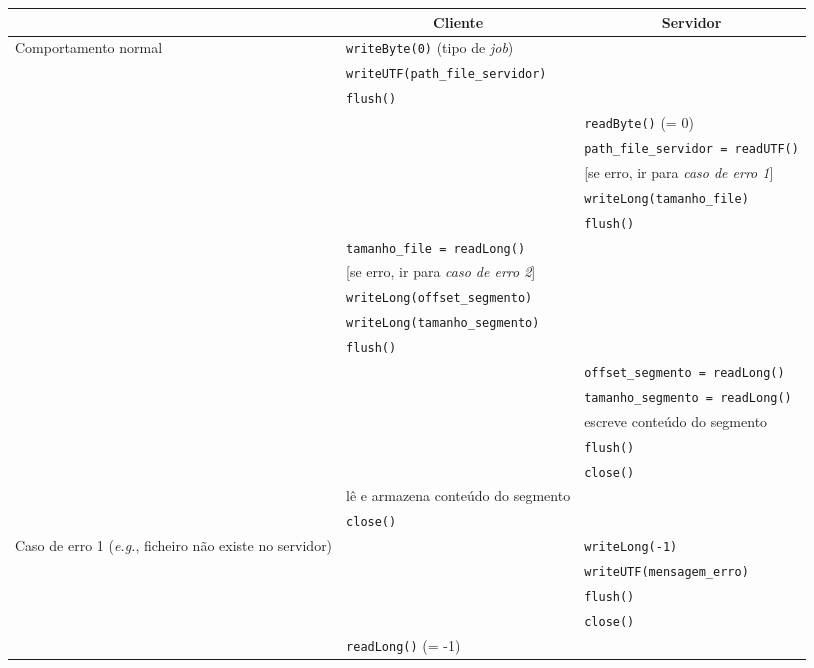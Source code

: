 \begin{table}[p]
    \centering
    \setlength{\tabcolsep}{6.5pt}
    \renewcommand{\arraystretch}{1.15}
    \begin{tabularx}{\textwidth}{|p{2cm}|X|X|}
        \cline{2-3}
        \multicolumn{1}{l|}{} & \multicolumn{1}{c|}{\textbf{Cliente}} & \multicolumn{1}{c|}{\textbf{Servidor}} \\
        \hline \multirow[t]{5}{=}{Comportamento normal}
         & \verb|writeByte(0)| (tipo de \emph{job}) & \\
         & \verb|writeUTF(path_file_servidor)| & \\
         & \verb|flush()| & \\
         & & \verb|readByte()| (= 0) \\
         & & \verb|path_file_servidor = readUTF()| \\
         & & [se erro, ir para \emph{caso de erro 1}] \\
         & & \verb|writeLong(tamanho_file)| \\
         & & \verb|flush()| \\
         & \verb|tamanho_file = readLong()| & \\
         & [se erro, ir para \emph{caso de erro 2}] & \\
         & \verb|writeLong(offset_segmento)| & \\
         & \verb|writeLong(tamanho_segmento)| & \\
         & \verb|flush()| & \\
         & & \verb|offset_segmento = readLong()| \\
         & & \verb|tamanho_segmento = readLong()| \\
         & & escreve conteúdo do segmento \\
         & & \verb|flush()| \\
         & & \verb|close()| \\
         & lê e armazena conteúdo do segmento & \\
         & \verb|close()| & \\
        \hline \multirow[t]{5}{=}{Caso de erro 1 (\emph{e.g.}, ficheiro não existe no servidor)}
         & & \verb|writeLong(-1)| \\
         & & \verb|writeUTF(mensagem_erro)| \\
         & & \verb|flush()| \\
         & & \verb|close()| \\
         & \verb|readLong()| (= -1) & \\

\end{tabularx}
\end{table}

